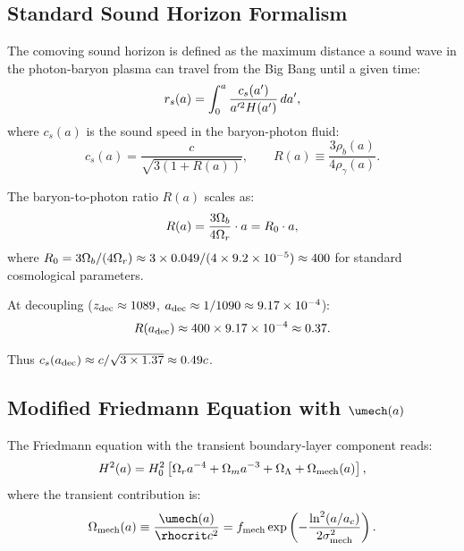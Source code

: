 \subsection{Standard Sound Horizon Formalism}
\label{sec:sound_horizon_standard}

The comoving sound horizon is defined as the maximum distance a sound wave in the photon-baryon plasma can travel from the Big Bang until a given time:
\begin{equation}
\label{eq:rs_definition}
r_s(a) = \int_0^a \frac{c_s(a')}{a'^2 H(a')} \, da',
\end{equation}
where $c_s(a)$ is the sound speed in the baryon-photon fluid:
\begin{equation}
\label{eq:cs_baryonphoton}
c_s(a) = \frac{c}{\sqrt{3(1 + R(a))}}, \qquad R(a) \equiv \frac{3\rho_b(a)}{4\rho_\gamma(a)}.
\end{equation}

The baryon-to-photon ratio $R(a)$ scales as:
\begin{equation}
\label{eq:R_scaling}
R(a) = \frac{3\Omega_b}{4\Omega_r} \cdot a = R_0 \cdot a,
\end{equation}
where $R_0 = 3\Omega_b/(4\Omega_r) \approx 3 \times 0.049/(4 \times 9.2 \times 10^{-5}) \approx 400$ for standard cosmological parameters.

At decoupling ($z_{\mathrm{dec}} \approx 1089$, $a_{\mathrm{dec}} \approx 1/1090 \approx 9.17 \times 10^{-4}$):
\begin{equation}
R(a_{\mathrm{dec}}) \approx 400 \times 9.17 \times 10^{-4} \approx 0.37.
\end{equation}

Thus $c_s(a_{\mathrm{dec}}) \approx c/\sqrt{3 \times 1.37} \approx 0.49c$.

\subsection{Modified Friedmann Equation with $\umech(a)$}
\label{sec:modified_friedmann}

The Friedmann equation with the transient boundary-layer component reads:
\begin{equation}
\label{eq:friedmann_modified}
H^2(a) = H_0^2 \left[ \Omega_r a^{-4} + \Omega_m a^{-3} + \Omega_\Lambda + \Omega_{\mathrm{mech}}(a) \right],
\end{equation}
where the transient contribution is:
\begin{equation}
\label{eq:Omega_mech}
\Omega_{\mathrm{mech}}(a) \equiv \frac{\umech(a)}{\rhocrit c^2} = \fmech \exp\left( -\frac{\ln^2(a/\ac)}{2\sigmamech^2} \right).
\end{equation}

